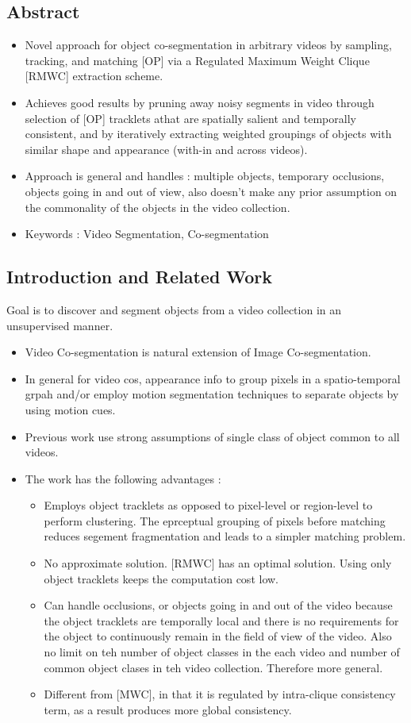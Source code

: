 \documentclass{article}
\begin{document}
\subsection{Abstract}
\begin{itemize}
\item Novel approach for object co-segmentation in arbitrary videos by sampling, tracking, and matching [OP] via a Regulated Maximum Weight Clique [RMWC] extraction scheme.
\item Achieves good results by pruning away noisy segments in video through selection of [OP] tracklets athat are spatially salient and temporally consistent, and by iteratively extracting weighted groupings of objects with similar shape and appearance (with-in and across videos).
\item Approach is general and handles : multiple objects, temporary occlusions, objects going in and out of view, also doesn't make any prior assumption on the commonality of the objects in the video collection.
\item Keywords : Video Segmentation, Co-segmentation
\end{itemize}

\subsection{Introduction and Related Work}
Goal is to discover and segment objects from a video collection in an unsupervised manner.

\begin{itemize}
\item Video Co-segmentation is natural extension of Image Co-segmentation.
\item In general for video cos, appearance info to group pixels in a spatio-temporal grpah and/or employ motion segmentation techniques to separate objects by using motion cues.
\item Previous work use strong assumptions of single class of object common to all videos.
\item The work has the following advantages :
  \begin{itemize}
  \item Employs object tracklets as opposed to pixel-level or region-level to perform clustering. The eprceptual grouping of pixels before matching reduces segement fragmentation and leads to a simpler matching problem.
  \item No approximate solution. [RMWC] has an optimal solution. Using only object tracklets keeps the computation cost low.
  \item Can handle occlusions, or objects going in and out of the video because the object tracklets are temporally local and there is no requirements for the object to continuously remain in the field of view of the video. Also no limit on teh number of object classes in the each video and number of common object clases in teh video collection. Therefore more general.
  \item Different from [MWC], in that it is regulated by intra-clique consistency term, as a result produces more global consistency.
  \end{itemize}
\end{itemize}
\end{document}
